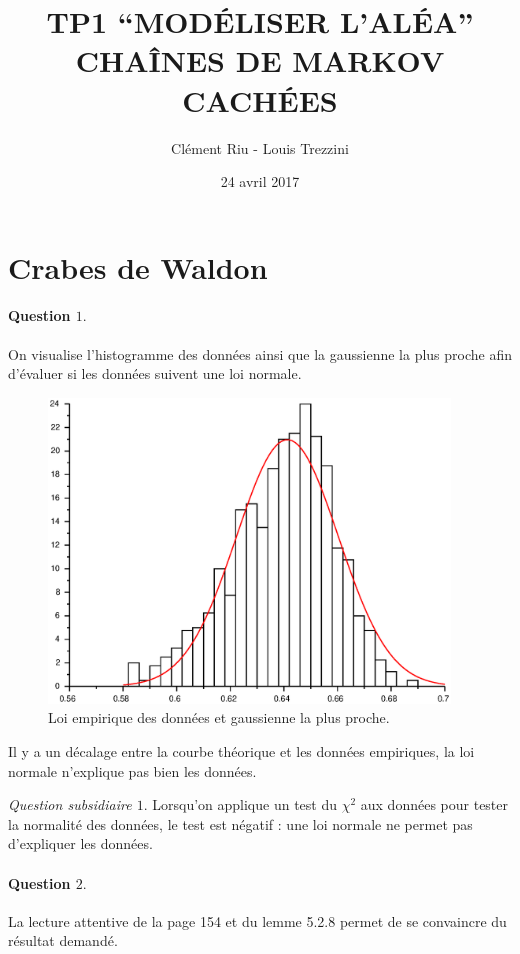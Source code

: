 \documentclass[12pt,a4paper]{article}
\title{\textbf{TP1 “MODÉLISER L’ALÉA” \\ CHAÎNES DE MARKOV CACHÉES}}
\author{Clément Riu - Louis Trezzini}
\date{24 avril 2017}
\begin{document}
\maketitle

\setcounter{section}{1}
\section{Crabes de Waldon}

\paragraph*{Question $1.$} On visualise l'histogramme des données ainsi que la gaussienne la plus proche afin d'évaluer si les données suivent une loi normale.

\begin{figure}[H]
	\centering
	\includegraphics[width=0.95\textwidth]{images/figure0.eps}
	\caption{Loi empirique des données et gaussienne la plus proche.}
\end{figure}

Il y a un décalage entre la courbe théorique et les données empiriques, la loi normale n'explique pas bien les données.

\textit{Question subsidiaire $1.$} Lorsqu'on applique un test du $\chi^2$ aux données pour tester la normalité des données, le test est négatif : une loi normale ne permet pas d'expliquer les données.

\paragraph*{Question $2.$} La lecture attentive de la page 154 et du lemme 5.2.8 permet de se convaincre du résultat demandé.
\end{document}
